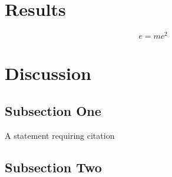 \documentclass[twoside,twocolumn]{article}
\begin{document}

\section{Results}


\blindtext %

\begin{equation}
\label{eq:emc}
e = mc^2
\end{equation}

\blindtext %


\section{Discussion}

\subsection{Subsection One}

A statement requiring citation %
\blindtext %

\subsection{Subsection Two}

\blindtext %





 

\end{document}
